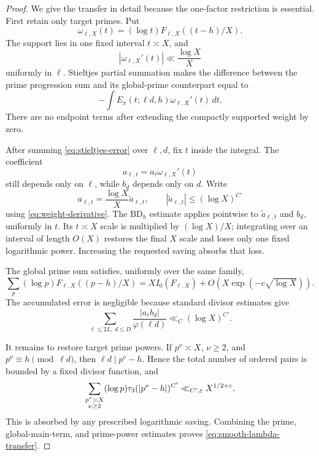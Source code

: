 \begin{proof}
We give the transfer in detail because the one-factor restriction is
essential.  First retain only target primes.  Put
\begin{equation}
 \omega_{\ell,X}(t)
 = (\log t)F_{\ell,X}((t-h)/X).
 \label{eq:stieltjes-weight}
\end{equation}
The support lies in one fixed interval $t\asymp X$, and
\begin{equation}
 |\omega_{\ell,X}'(t)|\ll\frac{\log X}{X}
 \label{eq:weight-derivative}
\end{equation}
uniformly in $\ell$.  Stieltjes partial summation makes the difference
between the prime progression sum and its global-prime counterpart
equal to
\begin{equation}
 -\int
 E_\pi(t;\ell d,h)\omega_{\ell,X}'(t)\,dt.
 \label{eq:stieltjes-error}
\end{equation}
There are no endpoint terms after extending the compactly supported
weight by zero.

After summing \eqref{eq:stieltjes-error} over $\ell,d$, fix $t$ inside
the integral.  The coefficient
\begin{equation}
 a_{\ell,t}=a_\ell\omega_{\ell,X}'(t)
 \label{eq:t-dependent-source-coefficient}
\end{equation}
still depends only on $\ell$, while $b_d$ depends only on $d$.
Write
\[
 a_{\ell,t}=\frac{\log X}{X}\widetilde a_{\ell,t},
 \qquad |\widetilde a_{\ell,t}|\le(\log X)^{C'}
\]
using \eqref{eq:weight-derivative}.  The $\mathrm{BD}_h$ estimate
applies pointwise to $\widetilde a_{\ell,t}$ and $b_d$, uniformly in
$t$.  Its $t\asymp X$ scale is multiplied by $(\log X)/X$; integrating
over an interval of length $O(X)$ restores the final $X$ scale and
loses only one fixed logarithmic power.  Increasing the requested
saving absorbs that loss.

The global prime sum satisfies, uniformly over the same family,
\begin{equation}
 \sum_p(\log p)F_{\ell,X}((p-h)/X)
 =XI_0(F_{\ell,X})+O(X\exp(-c\sqrt{\log X})).
 \label{eq:global-pnt-family}
\end{equation}
The accumulated error is negligible because standard divisor estimates
give
\begin{equation}
 \sum_{\ell\le2L,\ d\le D}
 \frac{|a_\ell b_d|}{\varphi(\ell d)}
 \ll_C(\log X)^{C'}.
 \label{eq:inverse-totient-weight}
\end{equation}

It remains to restore target prime powers.  If $p^\nu\asymp X$,
$\nu\ge2$, and $p^\nu\equiv h\pmod{\ell d}$, then
$\ell d\mid p^\nu-h$.  Hence the total number of ordered pairs is
bounded by a fixed divisor function, and
\begin{equation}
 \sum_{\substack{p^\nu\asymp X\\\nu\ge2}}
 (\log p)\tau_3(|p^\nu-h|)^{C'}
 \ll_{C',\varepsilon}X^{1/2+\varepsilon}.
 \label{eq:target-prime-powers}
\end{equation}
This is absorbed by any prescribed logarithmic saving.  Combining the
prime, global-main-term, and prime-power estimates proves
\eqref{eq:smooth-lambda-transfer}.
\end{proof}

